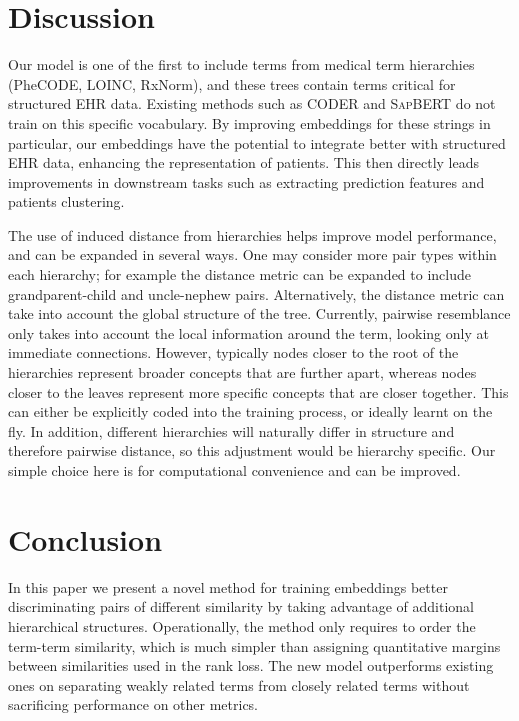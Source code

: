 \documentclass[12pt,a4paper]{cibb}
\begin{document}
\section{Discussion}

Our model is one of the first to include terms from medical term hierarchies (PheCODE, LOINC, RxNorm), and these trees contain terms critical for structured EHR data. Existing methods such as \textsc{CODER} and \textsc{SapBERT} do not train on this specific vocabulary. By improving embeddings for these strings in particular, our embeddings have the potential to integrate better with structured EHR data, enhancing the representation of patients. 
This then directly leads improvements in downstream tasks such as extracting prediction features and patients clustering.


The use of induced distance from hierarchies helps improve model performance, and can be expanded in several ways. One may consider more pair types within each hierarchy; for example the distance metric can be expanded to include grandparent-child and uncle-nephew pairs. Alternatively, the distance metric can take into account the global structure of the tree. Currently, pairwise resemblance only takes into account the local information around the term, looking only at immediate connections. However, typically nodes closer to the root of the hierarchies represent broader concepts that are further apart, whereas nodes closer to the leaves represent more specific concepts that are closer together. This can either be explicitly coded into the training process, or ideally learnt on the fly. In addition, different hierarchies will naturally differ in structure and therefore pairwise distance, so this adjustment would be hierarchy specific. Our simple choice here is for computational convenience and can be improved.

\section{Conclusion}
In this paper we present a novel method for training embeddings better discriminating pairs of different similarity by taking advantage of additional hierarchical structures. Operationally, the method only requires to order the term-term similarity, which is much simpler than assigning quantitative margins between similarities used in the rank loss.   
The new model outperforms existing ones on separating weakly related terms from closely related terms without sacrificing performance on other metrics. 
\end{document}
